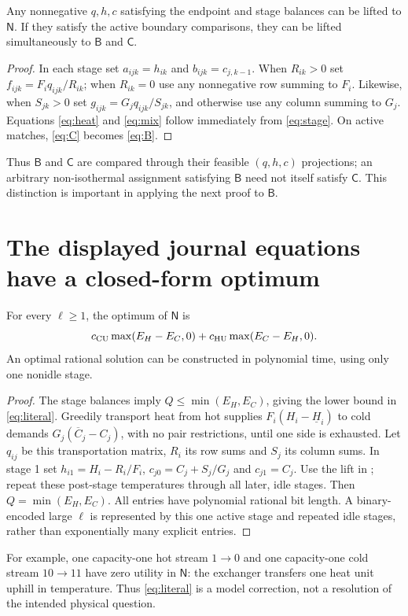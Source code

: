 \documentclass[11pt,a4paper]{report}
\newcommand{\CC}{\mathsf{C}}
\newcommand{\BB}{\mathsf{B}}
\newcommand{\NN}{\mathsf{N}}
\begin{document}
\begin{lemma}[note=Isothermal lifting]\label{lem:lift}
Any nonnegative $q,h,c$ satisfying the endpoint and stage balances can be
lifted to $\NN$. If they satisfy the active boundary comparisons, they can be
lifted simultaneously to $\BB$ and $\CC$.
\end{lemma}
\begin{proof}
In each stage set $a_{ijk}=h_{ik}$ and $b_{ijk}=c_{j,k-1}$.
When $R_{ik}>0$ set $f_{ijk}=F_iq_{ijk}/R_{ik}$; when $R_{ik}=0$ use any
nonnegative row summing to $F_i$. Likewise, when $S_{jk}>0$ set
$g_{ijk}=G_jq_{ijk}/S_{jk}$, and otherwise use any column summing to $G_j$.
Equations \eqref{eq:heat} and \eqref{eq:mix} follow immediately from
\eqref{eq:stage}. On active matches, \eqref{eq:C} becomes \eqref{eq:B}.
\end{proof}
Thus $\BB$ and $\CC$ are compared through their feasible $(q,h,c)$ projections;
an arbitrary non-isothermal assignment satisfying $\BB$ need not itself
satisfy $\CC$. This distinction is important in applying the next proof to
$\BB$.

\section{The displayed journal equations have a closed-form optimum}
\begin{theorem}\label{thm:literal}
For every $\ell\geq1$, the optimum of $\NN$ is
\begin{equation}\label{eq:literal}
 c_{\rm CU}\max(E_H-E_C,0)+c_{\rm HU}\max(E_C-E_H,0).
\end{equation}
An optimal rational solution can be constructed in polynomial time, using
only one nonidle stage.
\end{theorem}
\begin{proof}
The stage balances imply $Q\leq\min(E_H,E_C)$, giving the lower bound in
\eqref{eq:literal}. Greedily transport heat from hot supplies
$F_i(H_i-\underline H_i)$ to cold demands $G_j(\overline C_j-C_j)$, with no
pair restrictions, until one side is exhausted. Let $q_{ij}$ be this
transportation matrix, $R_i$ its row sums and $S_j$ its column sums. In stage 1
set $h_{i1}=H_i-R_i/F_i$, $c_{j0}=C_j+S_j/G_j$ and $c_{j1}=C_j$.
Use the lift in ; repeat these post-stage temperatures through
all later, idle stages. Then $Q=\min(E_H,E_C)$. All entries have polynomial
rational bit length. A binary-encoded large $\ell$ is represented by this
one active stage and repeated idle stages, rather than exponentially many
explicit entries.
\end{proof}
For example, one capacity-one hot stream $1\to0$ and one capacity-one cold
stream $10\to11$ have zero utility in $\NN$: the exchanger transfers one heat
unit uphill in temperature. Thus \eqref{eq:literal} is a model correction,
not a resolution of the intended physical question.
\end{document}
